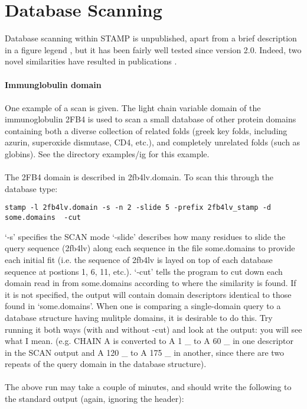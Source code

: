 \section{Database Scanning}

Database scanning within STAMP is unpublished, apart from a brief description in a figure 
legend \cite{matthews94}, but it has been fairly well tested
since version 2.0.  Indeed, two novel similarities have resulted
in publications \cite{rb93b,matthews94}.\\
\\
{\bf Immunglobulin domain}\\
\\
One example of a scan is given.  The light chain variable domain
of the immunoglobulin 2FB4 is used to scan a small database of
other protein domains containing both a diverse collection of
related folds (greek key folds, including azurin, superoxide
dismutase, CD4, etc.), and completely unrelated folds (such as
globins).  See the directory examples/ig for this example.\\
\\
The 2FB4 domain is described in 2fb4lv.domain.  To scan this 
through the database type:\\

\begin{scriptsize}\begin{verbatim}
stamp -l 2fb4lv.domain -s -n 2 -slide 5 -prefix 2fb4lv_stamp -d some.domains  -cut
\end{verbatim} \end{scriptsize}

`-s' specifies the SCAN mode `-slide' describes how many residues to slide the
query sequence (2fb4lv) along each sequence in the file some.domains to provide
each initial fit (i.e. the sequence of 2fb4lv is layed on top of each database
sequence at postions 1, 6, 11, etc.). `-cut' tells the program to cut down each
domain read in from some.domains according to where the similarity is found.  
If it is not specified, the output will contain domain descriptors identical to
those found in `some.domains'.  When one is comparing a single-domain query to
a database structure having mulitple domains, it is desirable to do this.   Try running
it both ways (with and without -cut) and look at the output: you will see what I mean.
(e.g. CHAIN A is converted to A 1 \_ to A 60 \_  in one descriptor in the SCAN
output and A 120 \_ to A 175 \_ in another, since there are two repeats of the
query domain in the database structure).\\
\\
The above run may take a couple of minutes, and should write the following to the
standard output (again, ignoring the header):

